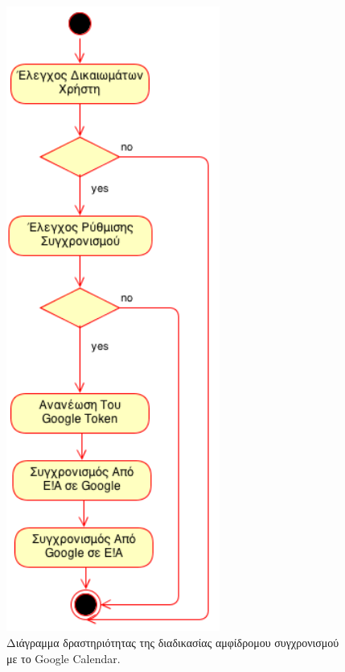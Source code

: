 \begin{figure}
\centering
\includegraphics[width=70mm]{images/ad-sync-appointments.png}
\caption{Διάγραμμα δραστηριότητας της διαδικασίας αμφίδρομου συγχρονισμού με το Google Calendar.}
\label{ad-sync-appointments}
\end{figure}

